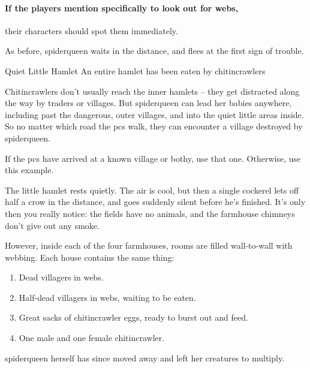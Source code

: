 \paragraph{If the players mention specifically to look out for webs,}
their characters should spot them immediately.


As before, \gls{spiderqueen} waits in the distance, and flees at the first sign of trouble.

{Quiet Little Hamlet}%
{An entire hamlet has been eaten by chitincrawlers}%


Chitincrawlers don't usually reach the inner hamlets -- they get distracted along the way by traders or \glspl{village}.
But \gls{spiderqueen} can lead her babies anywhere, including past the dangerous, outer \glspl{village}, and into the quiet little areas inside.
So no matter which road the \glspl{pc} walk, they can encounter a village destroyed by \gls{spiderqueen}.

If the \glspl{pc} have arrived at a known \gls{village} or \gls{bothy}, use that one.
Otherwise, use this example.

\begin{boxtext}

  The little hamlet rests quietly.
  The air is cool, but then a single cockerel lets off half a crow in the distance, and goes suddenly silent before he's finished.
  It's only then you really notice: the fields have no animals, and the farmhouse chimneys don't give out any smoke.

\end{boxtext}

However, inside each of the four farmhouses, rooms are filled wall-to-wall with webbing.  Each house contains the same thing:

\begin{enumerate}
  \item
  Dead villagers in webs.
  \item
  Half-dead villagers in webs, waiting to be eaten.
  \item
  Great sacks of chitincrawler eggs, ready to burst out and feed.
  \item
  One male and one female chitincrawler.
\end{enumerate}

\Gls{spiderqueen} herself has since moved away and left her creatures to multiply.

